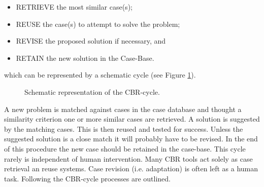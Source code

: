 \begin{itemize}
  \item RETRIEVE the most similar case(s);
  \item REUSE the case(s) to attempt to solve the problem;
  \item REVISE the proposed solution if necessary, and
  \item RETAIN the new solution in the Case-Base.
\end{itemize}
which can be represented by a schematic cycle (see Figure \ref{cbr}).

\begin{figure}[h!]
\begin{minipage}[b]{1\linewidth}
 \centering
\end{minipage}
\caption{Schematic representation of the CBR-cycle.} 
\label{cbr}
\end{figure}

A new problem is matched against cases in the case database and thought a similarity 
criterion one or more similar cases are retrieved. A solution is suggested by the 
matching cases. This is then reused and tested for success. Unless the suggested solution 
is a close match it will probably have to be revised. In the end of this procedure the 
new case should be retained in the case-base. This cycle rarely is independent of 
human intervention. Many CBR tools act solely as case retrieval an reuse systems. 
Case revision (i.e. adaptation) is often left as a human task. Following the CBR-cycle processes are outlined.

